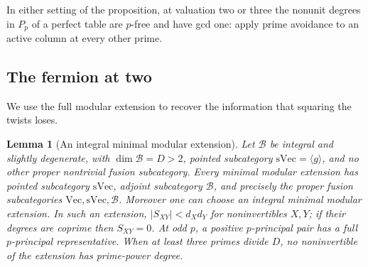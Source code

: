 \documentclass[11pt,a4paper]{article}
\numberwithin{equation}{section}
\newtheorem{lemma}[theorem]{Lemma}
\theoremstyle{remark}
\renewcommand{\Vec}{\mathrm{Vec}}
\newcommand{\sVec}{\mathrm{sVec}}
\begin{document}
In either setting of the proposition, at valuation two or three the
nonunit degrees in $P_p$ of a perfect table are $p$-free and have
gcd one: apply prime avoidance to an active column at every other prime.

\subsection{The fermion at two}
We use the full modular extension to recover the information that squaring the twists loses.

\begin{lemma}[An integral minimal modular extension]\label{lem:integral-minimal-extension}
Let $\mathcal B$ be integral and slightly degenerate, with
$\dim\mathcal B=D>2$, pointed subcategory $\sVec=\langle g\rangle$,
and no other proper nontrivial fusion subcategory.
Every minimal modular extension has pointed subcategory $\sVec$,
adjoint subcategory $\mathcal B$, and precisely the proper fusion
subcategories $\Vec,\sVec,\mathcal B$.
Moreover one can choose an integral minimal modular extension.
In such an extension, $|S_{XY}|<d_Xd_Y$ for noninvertibles $X,Y$; if their degrees are coprime then $S_{XY}=0$. At odd $p$, a positive $p$-principal pair has a full $p$-principal representative. When at least three primes divide $D$, no noninvertible of the extension has prime-power degree.
\end{lemma}
\end{document}
